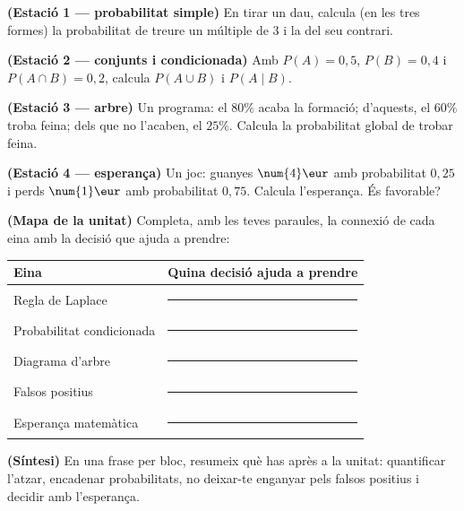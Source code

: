\begin{exercicis}
\begin{exlist}
  \item \textbf{(Estació 1 — probabilitat simple)} En tirar un dau, calcula (en les tres
        formes) la probabilitat de treure un múltiple de $3$ i la del seu contrari.
  \item \textbf{(Estació 2 — conjunts i condicionada)} Amb $P(A)=0,5$, $P(B)=0,4$ i
        $P(A\cap B)=0,2$, calcula $P(A\cup B)$ i $P(A\mid B)$.
  \item \textbf{(Estació 3 — arbre)} Un programa: el $80\%$ acaba la formació; d'aquests,
        el $60\%$ troba feina; dels que no l'acaben, el $25\%$. Calcula la probabilitat
        global de trobar feina.
  \item \textbf{(Estació 4 — esperança)} Un joc: guanyes $\num{4}\eur$ amb probabilitat
        $0,25$ i perds $\num{1}\eur$ amb probabilitat $0,75$. Calcula l'esperança. És
        favorable?
  \item \textbf{(Mapa de la unitat)} Completa, amb les teves paraules, la connexió de
        cada eina amb la decisió que ajuda a prendre:
        \begin{center}
        \renewcommand{\arraystretch}{1.4}
        \begin{tabular}{p{4.8cm} p{7.8cm}}
        \toprule
        \textbf{Eina} & \textbf{Quina decisió ajuda a prendre} \\
        \midrule
        Regla de Laplace & \rule{7.2cm}{0.4pt} \\
        Probabilitat condicionada & \rule{7.2cm}{0.4pt} \\
        Diagrama d'arbre & \rule{7.2cm}{0.4pt} \\
        Falsos positius & \rule{7.2cm}{0.4pt} \\
        Esperança matemàtica & \rule{7.2cm}{0.4pt} \\
        \bottomrule
        \end{tabular}
        \end{center}
  \item \textbf{(Síntesi)} En una frase per bloc, resumeix què has après a la unitat:
        quantificar l'atzar, encadenar probabilitats, no deixar-te enganyar pels falsos
        positius i decidir amb l'esperança.
\end{exlist}
\end{exercicis}

